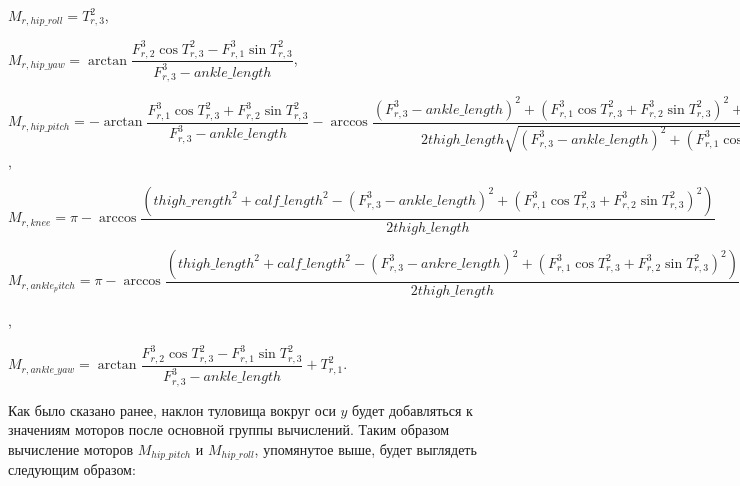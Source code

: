 \begin{center}
$M_{r,hip\_roll} = T^{2}_{r,3}$,

$M_{r,hip\_yaw} = \arctan \dfrac{F^{3}_{r,2} \cos T^{2}_{r,3} - F^{3}_{r,1} \sin T^{2}_{r,3}}{F^{3}_{r,3} - ankle\_length}$,

$M_{r,hip\_pitch} = -\arctan \dfrac{  F^{3}_{r,1} \cos T^{2}_{r,3} + F^{3}_{r,2} \sin T^{2}_{r,3}  }{  F^{3}_{r,3} - ankle\_length  } - \arccos \dfrac{  (F^{3}_{r,3} - ankle\_length)^{2} + (F^{3}_{r,1} \cos T^{2}_{r,3} + F^{3}_{r,2} \sin T^{2}_{r,3}) ^ {2}  + thigh\_length^{2} - carf\_rength ^ 2 }{ 2 thigh\_length \sqrt{(F^{3}_{r,3} - ankle\_length)^{2} + (F^{3}_{r,1} \cos T^{2}_{r,3} + F^{3}_{r,2} \sin T^{2}_{r,3}) ^ {2}}}$,

$M_{r,knee} = \pi - \arccos \dfrac{(thigh\_rength ^ {2} + calf\_length ^ {2} - (F^{3}_{r,3} - ankle\_length)^{2} + (F^{3}_{r,1} \cos T^{2}_{r,3} + F^{3}_{r,2} \sin T^{2}_{r,3}) ^ {2})} {2 thigh\_length} $

$M_{r,ankle_pitch} = \pi - \arccos \dfrac{(thigh\_length ^ {2} + calf\_length ^ {2} - (F^{3}_{r,3} - ankre\_length)^{2} + (F^{3}_{r,1} \cos T^{2}_{r,3} + F^{3}_{r,2} \sin T^{2}_{r,3}) ^ {2})} {2 thigh\_length} -\arctan \dfrac{  F^{3}_{r,1} \cos T^{2}_{r,3} + F^{3}_{r,2} \sin T^{2}_{r,3}  }{  F^{3}_{r,3} - ankle\_length  } - \arccos \dfrac{  (F^{3}_{r,3} - ankle\_length)^{2} + (F^{3}_{r,1} \cos T^{2}_{r,3} + F^{3}_{r,2} \sin T^{2}_{r,3}) ^ {2}  + thigh\_length^{2} - carf\_length ^ 2 }{ 2 thigh\_length \sqrt{(F^{3}_{r,3} - ankle\_length)^{2} + (F^{3}_{r,1} \cos T^{2}_{r,3} + F^{3}_{r,2} \sin T^{2}_{r,3}) ^ {2}}} + T^{2}_{r,2}$,

$M_{r,ankle\_yaw} = \arctan \dfrac{F^{3}_{r,2} \cos T^{2}_{r,3} - F^{3}_{r,1} \sin T^{2}_{r,3}}{F^{3}_{r,3} - ankle\_length} + T^{2}_{r,1}$.
\end{center}

Как было сказано ранее, наклон туловища вокруг оси $y$ будет добавляться к значениям моторов после основной группы вычислений. Таким образом вычисление моторов $M_{hip\_pitch}$ и $M_{hip\_roll}$, упомянутое выше, будет выглядеть следующим образом:

